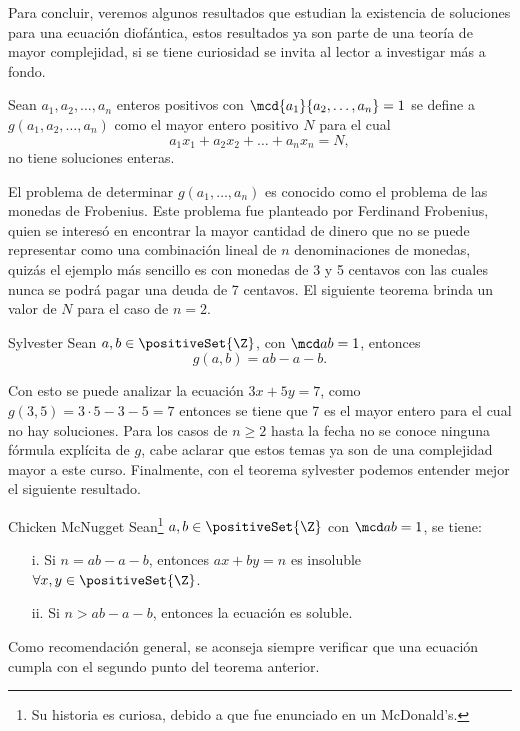 Para concluir, veremos algunos resultados que estudian la existencia de soluciones para una ecuación diofántica, estos
resultados ya son parte de una teoría de mayor complejidad, si se tiene curiosidad se invita al lector a investigar más a fondo.

\begin{definition.box}{}{}
    Sean  $a_1,a_2,\ldots,a_n$ enteros positivos con $\mcd{a_1}{a_2,\ldots,a_n} = 1$ se define a $g(a_1,a_2,\ldots,a_n)$
    como el mayor entero positivo $N$ para el cual
    \[
        a_1 x_1 + a_2 x_2 + \ldots + a_n x_n = N,
    \]
    no tiene soluciones enteras.
\end{definition.box}

El problema de determinar $g(a_1,\ldots,a_n)$ es conocido como el problema de las monedas de Frobenius.
Este problema fue planteado por Ferdinand Frobenius, quien se interesó en encontrar la mayor cantidad de dinero que no
se puede representar como una combinación lineal de $n$ denominaciones de monedas,
quizás el ejemplo más sencillo es con monedas de 3 y 5 centavos con las cuales nunca se podrá pagar una deuda de 7 centavos.
El siguiente teorema brinda un valor de $N$ para el caso de $n=2$.

\begin{theorem.box}{Sylvester}{}
    Sean $a,b \in \positiveSet{\Z}$, con $\mcd a b = 1$, entonces
    \[
        g(a,b) = ab - a - b.
    \]
\end{theorem.box}
Con esto se puede analizar la ecuación $3x + 5y = 7$, como $g(3,5) = 3\cdot 5 - 3 - 5 = 7$
entonces se tiene que 7 es el mayor entero para el cual no hay soluciones.
Para los casos de $n\geq2$ hasta la fecha no se conoce ninguna fórmula explícita de $g$, cabe aclarar que estos temas
ya son de una complejidad mayor a este curso.
Finalmente, con el teorema sylvester podemos entender mejor el siguiente resultado.

\begin{theorem.box}{Chicken McNugget}{}
    Sean\footnote{Su historia es curiosa, debido a que fue enunciado en un McDonald's.} $a, b\in \positiveSet{\Z}$ con $\mcd a b = 1$, se tiene:
    \begin{enumerate}
        \item[i.] Si $n = ab - a - b$, entonces $ax + by = n$ es insoluble $\forall x, y \in \positiveSet{\Z}$.
        \item[ii.] Si $n > ab - a - b$, entonces la ecuación es soluble.
    \end{enumerate}
\end{theorem.box}
Como recomendación general, se aconseja siempre verificar que una ecuación cumpla con el segundo punto del teorema anterior.





